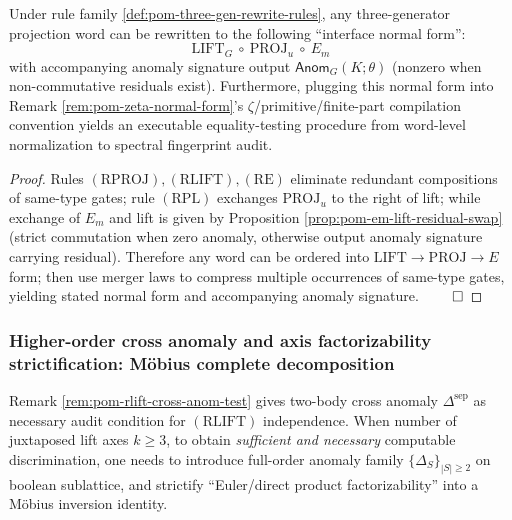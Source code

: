 \begin{proposition}\label{prop:pom-three-gen-interface-normal-form}
Under rule family \ref{def:pom-three-gen-rewrite-rules}, any three-generator projection word can be rewritten to the following ``interface normal form'':
$$
\boxed{\;
\mathrm{LIFT}_G\ \circ\ \mathrm{PROJ}_u\ \circ\ E_m
\;}
$$
with accompanying anomaly signature output \(\mathsf{Anom}_G(K;\theta)\) (nonzero when non-commutative residuals exist).
Furthermore, plugging this normal form into Remark \ref{rem:pom-zeta-normal-form}'s \(\zeta\)/primitive/finite-part compilation convention yields an executable equality-testing procedure from word-level normalization to spectral fingerprint audit.
\end{proposition}

\begin{proof}
Rules \((\mathrm{RPROJ}),(\mathrm{RLIFT}),(\mathrm{RE})\) eliminate redundant compositions of same-type gates; rule \((\mathrm{RPL})\) exchanges \(\mathrm{PROJ}_u\) to the right of lift; while exchange of \(E_m\) and lift is given by Proposition \ref{prop:pom-em-lift-residual-swap} (strict commutation when zero anomaly, otherwise output anomaly signature carrying residual).
Therefore any word can be ordered into \(\mathrm{LIFT}\to \mathrm{PROJ}\to E\) form; then use merger laws to compress multiple occurrences of same-type gates, yielding stated normal form and accompanying anomaly signature. $\qed$
\end{proof}

\subsubsection{Higher-order cross anomaly and axis factorizability strictification: Möbius complete decomposition}\label{subsec:pom-rlift-higher-cross-anom}

Remark \ref{rem:pom-rlift-cross-anom-test} gives two-body cross anomaly \(\Delta^{\mathrm{sep}}\) as necessary audit condition for \((\mathrm{RLIFT})\) independence.
When number of juxtaposed lift axes \(k\ge 3\), to obtain \emph{sufficient and necessary} computable discrimination, one needs to introduce full-order anomaly family \(\{\Delta_S\}_{|S|\ge 2}\) on boolean sublattice, and strictify ``Euler/direct product factorizability'' into a Möbius inversion identity.

